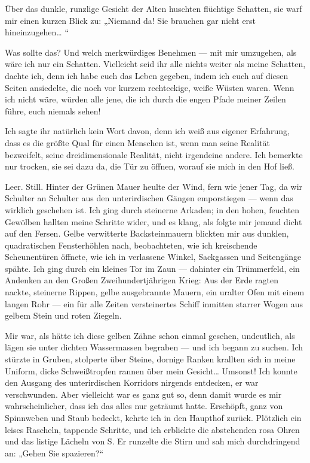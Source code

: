 Über das dunkle, runzlige Gesicht der Alten huschten flüchtige
Schatten, sie warf mir einen kurzen Blick zu: „Niemand da! Sie
brauchen gar nicht erst hineinzugehen\ldots{} “

Was sollte das? Und welch merkwürdiges Benehmen — mit mir
umzugehen, als wäre ich nur ein Schatten. Vielleicht seid ihr alle
nichts weiter als meine Schatten, dachte ich, denn ich habe euch
das Leben gegeben, indem ich euch auf diesen Seiten ansiedelte, die
noch vor kurzem rechteckige, weiße Wüsten waren. Wenn ich nicht
wäre, würden alle jene, die ich durch die engen Pfade meiner Zeilen
führe, euch niemals sehen!

Ich sagte ihr natürlich kein Wort davon, denn ich weiß aus eigener
Erfahrung, dass es die größte Qual für einen Menschen ist, wenn man
seine Realität bezweifelt, seine dreidimensionale Realität, nicht
irgendeine andere. Ich bemerkte nur trocken, sie sei dazu da, die
Tür zu öffnen, worauf sie mich in den Hof ließ.

Leer. Still. Hinter der Grünen Mauer heulte der Wind, fern wie
jener Tag, da wir Schulter an Schulter aus den unterirdischen
Gängen emporstiegen — wenn das wirklich geschehen ist. Ich ging
durch steinerne Arkaden; in den hohen, feuchten Gewölben hallten
meine Schritte wider, und es klang, als folgte mir jemand dicht auf
den Fersen. Gelbe verwitterte Backsteinmauern blickten mir aus
dunklen, quadratischen Fensterhöhlen nach, beobachteten, wie ich
kreischende Scheunentüren öffnete, wie ich in verlassene Winkel,
Sackgassen und Seitengänge spähte. Ich ging durch ein kleines Tor
im Zaun — dahinter ein Trümmerfeld, ein Andenken an den Großen
Zweihundertjährigen Krieg: Aus der Erde ragten nackte, steinerne
Rippen, gelbe ausgebrannte Mauern, ein uralter Ofen mit einem
langen Rohr — ein für alle Zeiten versteinertes Schiff inmitten
starrer Wogen aus gelbem Stein und roten Ziegeln.

Mir war, als hätte ich diese gelben Zähne schon einmal gesehen,
undeutlich, als lägen sie unter dichten Wassermassen begraben — und
ich begann zu suchen. Ich stürzte in Gruben, stolperte über Steine,
dornige Ranken krallten sich in meine Uniform, dicke Schweißtropfen
rannen über mein Gesicht\ldots{} Umsonst! Ich konnte den Ausgang des
unterirdischen Korridors nirgends entdecken, er war verschwunden.
Aber vielleicht war es ganz gut so, denn damit wurde es mir
wahrscheinlicher, dass ich das alles nur geträumt hatte. Erschöpft,
ganz von Spinnweben und Staub bedeckt, kehrte ich in den Haupthof
zurück. Plötzlich ein leises Rascheln, tappende Schritte, und ich
erblickte die abstehenden rosa Ohren und das listige Lächeln von S.
Er runzelte die Stirn und sah mich durchdringend an: „Gehen Sie
spazieren?“

